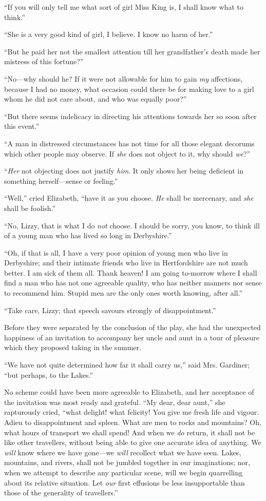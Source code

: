 \documentclass[12pt,openright]{book}
\begin{document}
“If you will only tell me what sort of girl Miss King is, I shall know what to think.”

“She is a very good kind of girl, I believe. I know no harm of her.”

“But he paid her not the smallest attention till her grandfather’s death made her mistress of this fortune?”

“No—why should he? If it were not allowable for him to gain \textit{my} affections, because I had no money, what occasion could there be for making love to a girl whom he did not care about, and who was equally poor?”

“But there seems indelicacy in directing his attentions towards her so soon after this event.”

“A man in distressed circumstances has not time for all those elegant decorums which other people may observe. If \textit{she} does not object to it, why should \textit{we}?”

“\textit{Her} not objecting does not justify \textit{him}. It only shows her being deficient in something herself—sense or feeling.”

“Well,” cried Elizabeth, “have it as you choose. \textit{He} shall be mercenary, and \textit{she} shall be foolish.”

“No, Lizzy, that is what I do \textit{not} choose. I should be sorry, you know, to think ill of a young man who has lived so long in Derbyshire.”

“Oh, if that is all, I have a very poor opinion of young men who live in Derbyshire; and their intimate friends who live in Hertfordshire are not much better. I am sick of them all. Thank heaven! I am going to-morrow where I shall find a man who has not one agreeable quality, who has neither manners nor sense to recommend him. Stupid men are the only ones worth knowing, after all.”

“Take care, Lizzy; that speech savours strongly of disappointment.”

Before they were separated by the conclusion of the play, she had the unexpected happiness of an invitation to accompany her uncle and aunt in a tour of pleasure which they proposed taking in the summer.

“We have not quite determined how far it shall carry us,” said Mrs. Gardiner; “but perhaps, to the Lakes.”

No scheme could have been more agreeable to Elizabeth, and her acceptance of the invitation was most ready and grateful. “My dear, dear aunt,” she rapturously cried, “what delight! what felicity! You give me fresh life and vigour. Adieu to disappointment and spleen. What are men to rocks and mountains? Oh, what hours of transport we shall spend! And when we \textit{do} return, it shall not be like other travellers, without being able to give one accurate idea of anything. We \textit{will} know where we have gone—we \textit{will} recollect what we have seen. Lakes, mountains, and rivers, shall not be jumbled together in our imaginations; nor, when we attempt to describe any particular scene, will we begin quarrelling about its relative situation. Let \textit{our} first effusions be less insupportable than those of the generality of travellers.”
\end{document}
